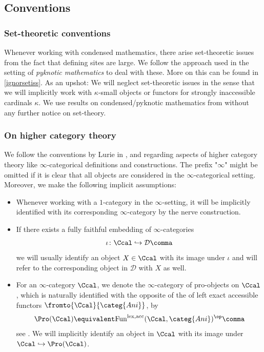 \documentclass[leqno]{article}
\renewcommand{\lex}{\mathrm{lex}}
\newcommand{\acc}{\mathrm{acc}}
\newcommand{\Funlexacc}{\Fun^{\lex,\acc}}
\renewcommand{\Fun}{\mathrm{Fun}}
\newcommand{\Ani}{\categ{Ani}}
\begin{document}

\subsection*{Conventions}\label{intro_subsec:notational_conventions}
\subsubsection*{Set-theoretic conventions}
Whenever working with condensed mathematics, there arise set-theoretic issues from the fact that defining sites are large. We follow the approach used in the setting of \textit{pyknotic mathematics} \cites{pyknoticI}{exodromy}  to deal with these. More on this can be found in \cref{ignorsetiss}. As an upshot: We will neglect set-theoretic issues in the sense that we will implicitly work with $\kappa$-small objects or functors for strongly inaccessible cardinals $\kappa$. We use results on condensed/pyknotic mathematics from \cites{pyknoticI}{Exodromy}{Scholze:condensednotes}{Scholze:analyticnotes} without any further notice on set-theory. 
\subsubsection*{On higher category theory}
We follow the conventions by Lurie in \cite{HTT}, \cite{Kerodon} and \cite{SAG} regarding aspects of higher category theory like $\infty$-categorical definitions and constructions.
The prefix "$\infty$" might be omitted if it is clear that all objects are considered in the $\infty$-categorical setting.
Moreover, we make the following implicit assumptions:
\begin{itemize}
\item Whenever working with a $1$-category in the $\infty$-setting, it will be implicitly identified with its corresponding $\infty$-category by the nerve construction.
\item If there exists a fully faithful embedding of $\infty$-categories 
$$\iota\colon \Ccal \hookrightarrow \mathcal{D}\comma $$ we will usually identify an object $X \in \Ccal$ with its image under $\iota$ and will refer to the corresponding object in $\mathcal{D}$ with $X$ as well.
\item For an $\infty$-category $\Ccal$, we denote the $\infty$-category of pro-objects on $\Ccal$, which is naturally identified with the opposite of the \category of left exact accessible functors $ \fromto{\Ccal}{\Ani} $, by
\begin{equation*}
        \Pro(\Ccal) \equivalent \Funlexacc(\Ccal,\Ani)^{\op} \comma
\end{equation*}
see \cite[ \& ]{SAG}. We will implicitly identify an object in $\Ccal$ with its image under $\Ccal\hookrightarrow\Pro(\Ccal)$. 
\end{itemize}
%
\end{document}
